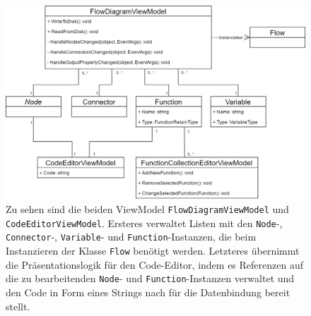 \begin{figure} %
	\centering
		\includegraphics[width=\textwidth]{img/FlowDiagramViewModelUML.png}
	\caption[Klassenstruktur der ViewModelSchicht]{Zu sehen sind die beiden ViewModel \texttt{FlowDiagramViewModel} und \texttt{CodeEditorViewModel}. Ersteres verwaltet Listen mit den \texttt{Node}-, \texttt{Connector}-, \texttt{Variable}- und \texttt{Function}-Instanzen, die beim Instanzieren der Klasse \texttt{Flow} benötigt werden. Letzteres übernimmt die Präsentationslogik für den Code-Editor, indem es Referenzen auf die zu bearbeitenden \texttt{Node}- und \texttt{Function}-Instanzen verwaltet und den Code in Form eines Strings nach für die Datenbindung bereit stellt.}
	\label{fig:UML:FlowViewModel}
\end{figure}

